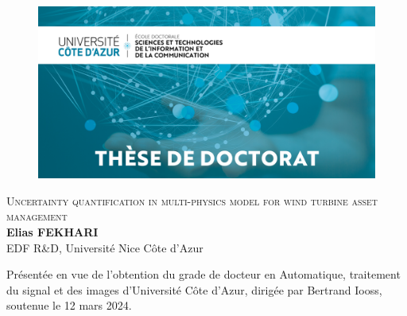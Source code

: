 {
\thispagestyle{empty}
\begin{figure}[t]
    \vspace*{-2.7cm}
    \begin{adjustwidth}{-28mm}{-21mm}
      \includegraphics[width=\paperwidth]{./part1/figures/UCA_STIC.jpg}
    \end{adjustwidth}
  \end{figure} 

\begin{adjustwidth}{-8mm}{-8mm}
\begin{center}
  {
  {\Huge \scshape{Uncertainty quantification in multi-physics model for wind turbine asset management}}\\[20pt]
  {\Large \textbf{Elias FEKHARI}}}\\
  {\large EDF R\&D, Université Nice Côte d'Azur\\[20pt]}
\end{center}
%
\vfill
\noindent
Présentée en vue de l’obtention du grade de docteur en Automatique, traitement du signal et des images 
d’Université Côte d’Azur, dirigée par Bertrand Iooss, soutenue le 12 mars 2024.\\


\end{adjustwidth}}
